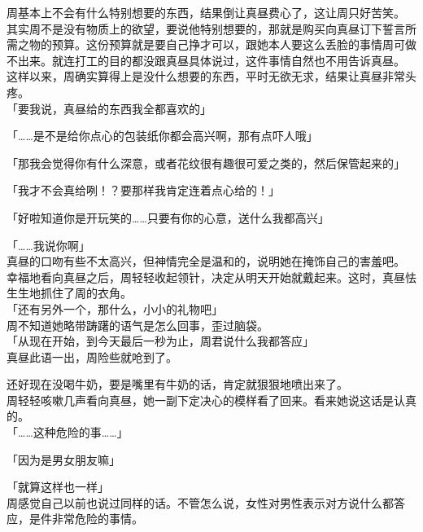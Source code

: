 周基本上不会有什么特别想要的东西，结果倒让真昼费心了，这让周只好苦笑。\\

其实周不是没有物质上的欲望，要说他特别想要的，那就是购买向真昼订下誓言所需之物的预算。这份预算就是要自己挣才可以，跟她本人要这么丢脸的事情周可做不出来。就连打工的目的都没跟真昼具体说过，这件事情自然也不用告诉真昼。\\

这样以来，周确实算得上是没什么想要的东西，平时无欲无求，结果让真昼非常头疼。\\

「要我说，真昼给的东西我全都喜欢的」

「……是不是给你点心的包装纸你都会高兴啊，那有点吓人哦」

「那我会觉得你有什么深意，或者花纹很有趣很可爱之类的，然后保管起来的」

「我才不会真给咧！？要那样我肯定连着点心给的！」

「好啦知道你是开玩笑的……只要有你的心意，送什么我都高兴」

「……我说你啊」\\

真昼的口吻有些不太高兴，但神情完全是温和的，说明她在掩饰自己的害羞吧。\\

幸福地看向真昼之后，周轻轻收起领针，决定从明天开始就戴起来。这时，真昼怯生生地抓住了周的衣角。\\

「还有另外一个，那什么，小小的礼物吧」\\

周不知道她略带踌躇的语气是怎么回事，歪过脑袋。\\

「从现在开始，到今天最后一秒为止，周君说什么我都答应」\\

真昼此语一出，周险些就呛到了。

还好现在没喝牛奶，要是嘴里有牛奶的话，肯定就狠狠地喷出来了。\\

周轻轻咳嗽几声看向真昼，她一副下定决心的模样看了回来。看来她说这话是认真的。\\

「……这种危险的事……」

「因为是男女朋友嘛」

「就算这样也一样」\\

周感觉自己以前也说过同样的话。不管怎么说，女性对男性表示对方说什么都答应，是件非常危险的事情。

